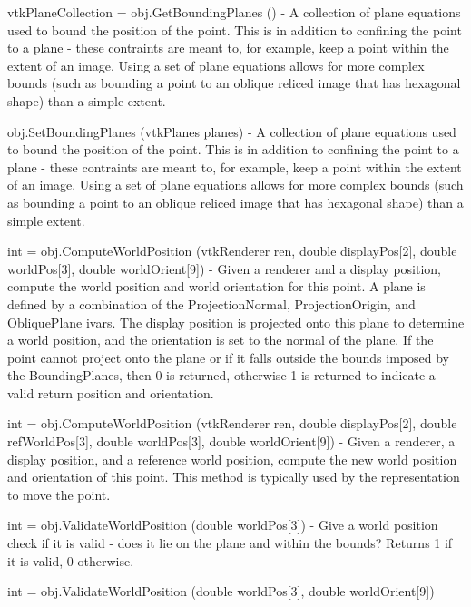 \begin{DoxyItemize}
\item {\ttfamily vtk\-Plane\-Collection = obj.\-Get\-Bounding\-Planes ()} -\/ A collection of plane equations used to bound the position of the point. This is in addition to confining the point to a plane -\/ these contraints are meant to, for example, keep a point within the extent of an image. Using a set of plane equations allows for more complex bounds (such as bounding a point to an oblique reliced image that has hexagonal shape) than a simple extent.  
\item {\ttfamily obj.\-Set\-Bounding\-Planes (vtk\-Planes planes)} -\/ A collection of plane equations used to bound the position of the point. This is in addition to confining the point to a plane -\/ these contraints are meant to, for example, keep a point within the extent of an image. Using a set of plane equations allows for more complex bounds (such as bounding a point to an oblique reliced image that has hexagonal shape) than a simple extent.  
\item {\ttfamily int = obj.\-Compute\-World\-Position (vtk\-Renderer ren, double display\-Pos\mbox{[}2\mbox{]}, double world\-Pos\mbox{[}3\mbox{]}, double world\-Orient\mbox{[}9\mbox{]})} -\/ Given a renderer and a display position, compute the world position and world orientation for this point. A plane is defined by a combination of the Projection\-Normal, Projection\-Origin, and Oblique\-Plane ivars. The display position is projected onto this plane to determine a world position, and the orientation is set to the normal of the plane. If the point cannot project onto the plane or if it falls outside the bounds imposed by the Bounding\-Planes, then 0 is returned, otherwise 1 is returned to indicate a valid return position and orientation.  
\item {\ttfamily int = obj.\-Compute\-World\-Position (vtk\-Renderer ren, double display\-Pos\mbox{[}2\mbox{]}, double ref\-World\-Pos\mbox{[}3\mbox{]}, double world\-Pos\mbox{[}3\mbox{]}, double world\-Orient\mbox{[}9\mbox{]})} -\/ Given a renderer, a display position, and a reference world position, compute the new world position and orientation of this point. This method is typically used by the representation to move the point.  
\item {\ttfamily int = obj.\-Validate\-World\-Position (double world\-Pos\mbox{[}3\mbox{]})} -\/ Give a world position check if it is valid -\/ does it lie on the plane and within the bounds? Returns 1 if it is valid, 0 otherwise.  
\item {\ttfamily int = obj.\-Validate\-World\-Position (double world\-Pos\mbox{[}3\mbox{]}, double world\-Orient\mbox{[}9\mbox{]})}  

\end{DoxyItemize}

